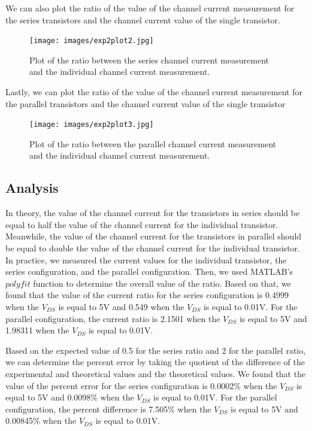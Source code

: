 \documentclass{article}
\begin{document}
We can also plot the ratio of the value of the channel current measurement for the series transistors and the channel current value of the single transistor.

\begin{figure}[H]   
    \begin{center}
  \texttt{[image: images/exp2plot2.jpg]}
  \caption{Plot of the ratio between the series channel current measurement and the individual channel current measurement.}
  \label{fig:exp2_plot2}
    \end{center}

\end{figure}

Lastly, we can plot the ratio of the value of the channel current measurement for the parallel transistors and the channel current value of the single transistor
\begin{figure}[H]   
  \begin{center}       
  \texttt{[image: images/exp2plot3.jpg]}
  \caption{Plot of the ratio between the parallel channel current measurement and the individual channel current measurement.}
  \label{fig:exp2_plot3}
  \end{center}
\end{figure}

\subsection{Analysis}
In theory, the value of the channel current for the transistors in series should be equal to half the value of the channel current for the individual transistor. Meanwhile, the value of the channel current for the transistors in parallel should be equal to double the value of the channel current for the individual transistor. 
\\
\newline
In practice, we measured the current values for the individual transistor, the series configuration, and the parallel configuration. Then, we used MATLAB's $polyfit$ function to determine the overall value of the ratio. Based on that, we found that the value of the current ratio for the series configuration is 0.4999 when the $V_{DS}$ is equal to 5V and 0.549 when the $V_{DS}$ is equal to 0.01V. For the parallel configuration, the current ratio is 2.1501 when the $V_{DS}$ is equal to 5V and 1.98311 when the $V_{DS}$ is equal to 0.01V.

Based on the expected value of 0.5 for the series ratio and 2 for the parallel ratio, we can determine the percent error by taking the quotient of the difference of the experimental and theoretical values and the theoretical values. We found that the value of the percent error for the series configuration is 0.0002\% when the $V_{DS}$ is equal to 5V and 0.0098\% when the $V_{DS}$ is equal to 0.01V. For the parallel configuration, the percent difference is 7.505\% when the $V_{DS}$ is equal to 5V and 0.00845\% when the $V_{DS}$ is equal to 0.01V.
\end{document}
